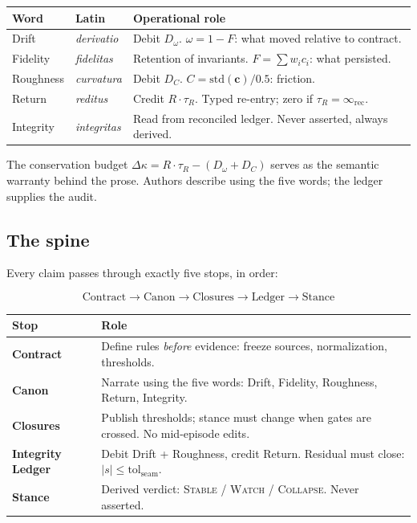 \documentclass[
  aps,
  prd,
  twocolumn,
  superscriptaddress,
  nofootinbib,
  floatfix
]{revtex4-2}
\newcommand{\tR}{\tau_{\!R}}
\newcommand{\IR}{\infty_{\mathrm{rec}}}
\newcommand{\tolseam}{\mathrm{tol}_{\mathrm{seam}}}
\newcommand{\beq}{\begin{equation}}
\newcommand{\eeq}{\end{equation}}
\newcommand{\regime}[1]{\textrm{\upshape\scshape#1}}
\newcommand{\tvec}{\mathbf{c}}
\begin{document}
\begin{center}
{\small\begin{tabular}{@{}llp{4.0cm}@{}}
\toprule
\textbf{Word} & \textbf{Latin} & \textbf{Operational role} \\
\midrule
Drift & \textit{derivatio} &
  Debit $D_\omega$. $\omega = 1 - F$:
  what moved relative to contract. \\[0.3em]
Fidelity & \textit{fidelitas} &
  Retention of invariants.
  $F = \sum w_i c_i$: what persisted. \\[0.3em]
Roughness & \textit{curvatura} &
  Debit $D_C$.
  $C = \mathrm{std}(\tvec)/0.5$: friction. \\[0.3em]
Return & \textit{reditus} &
  Credit $R \cdot \tR$.
  Typed re-entry; zero if $\tR = \IR$. \\[0.3em]
Integrity & \textit{integritas} &
  Read from reconciled ledger.
  Never asserted, always derived. \\
\bottomrule
\end{tabular}}
\end{center}

The conservation budget $\Delta\kappa = R \cdot \tR - (D_\omega
+ D_C)$ serves as the semantic warranty behind the prose.  Authors
describe using the five words; the ledger supplies the audit.

\subsection{The spine}

Every claim passes through exactly five stops, in order:

\beq
\text{Contract} \to \text{Canon} \to \text{Closures}
  \to \text{Ledger} \to \text{Stance}
\eeq

\begin{center}
{\small\begin{tabular}{@{}lp{5.5cm}@{}}
\toprule
\textbf{Stop} & \textbf{Role} \\
\midrule
\textbf{Contract} &
  Define rules \emph{before} evidence: freeze sources,
  normalization, thresholds. \\[0.3em]
\textbf{Canon} &
  Narrate using the five words: Drift, Fidelity,
  Roughness, Return, Integrity. \\[0.3em]
\textbf{Closures} &
  Publish thresholds; stance must change when
  gates are crossed.  No mid-episode edits. \\[0.3em]
\textbf{Integrity Ledger} &
  Debit Drift + Roughness, credit Return.
  Residual must close: $|s| \leq \tolseam$. \\[0.3em]
\textbf{Stance} &
  Derived verdict: \regime{Stable} /
  \regime{Watch} / \regime{Collapse}.  Never asserted. \\
\bottomrule
\end{tabular}}
\end{center}
\end{document}
